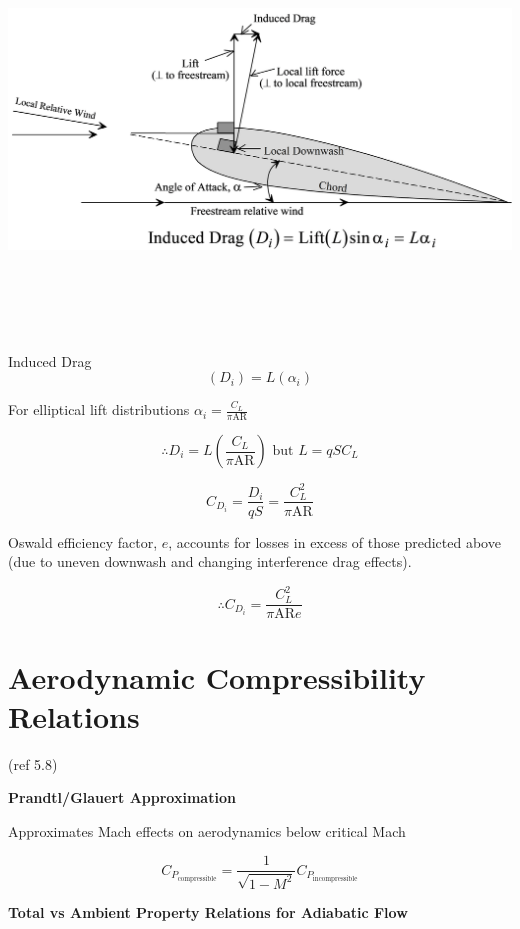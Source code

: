 \documentclass[
]{book}
\begin{document}
\includegraphics[width=8.8in,height=4.25in]{media/05/image51.svg}

Induced Drag \[\left(D_i\right)=L\left(\alpha_i\right)\]

For elliptical lift distributions \(\alpha_i = \frac{C_L}{\pi \mathrm{AR}}\)

\[\therefore D_i = L \left(\frac{C_L}{\pi \mathrm{AR}}\right) \text{ but } L=qSC_L \]

\[C_{D_i} = \frac{D_i}{qS} = \frac{C_L^2}{\pi \mathrm{AR}}\]

Oswald efficiency factor, \(e\), accounts for losses in excess of those predicted above (due to uneven downwash and changing interference drag effects).

\[\therefore C_{D_i} = \frac{C_L^2}{\pi \mathrm{AR} e}\]

\hypertarget{aerodynamic-compressibility-relations}{%
\section{Aerodynamic Compressibility Relations}\label{aerodynamic-compressibility-relations}}

(ref 5.8)

\textbf{Prandtl/Glauert Approximation}

Approximates Mach effects on aerodynamics below critical Mach

\[C_{P_{\mathrm{compressible}}} = \frac{1}{\sqrt{1-M^2}}C_{P_{\mathrm{incompressible}}} \]

\textbf{Total vs Ambient Property Relations for Adiabatic Flow}
\end{document}
